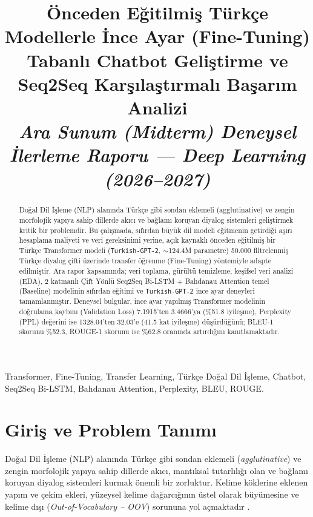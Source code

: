 \documentclass[conference]{IEEEtran}
\begin{document}
\title{Önceden Eğitilmiş Türkçe Modellerle İnce Ayar (Fine-Tuning) Tabanlı Chatbot Geliştirme ve Seq2Seq Karşılaştırmalı Başarım Analizi\\
{\large\textit{Ara Sunum (Midterm) Deneysel İlerleme Raporu --- Deep Learning (2026--2027)}}}

\author{
}

\maketitle

\begin{abstract}
Doğal Dil İşleme (NLP) alanında Türkçe gibi sondan eklemeli (agglutinative) ve zengin morfolojik yapıya sahip dillerde akıcı ve bağlamı koruyan diyalog sistemleri geliştirmek kritik bir problemdir. Bu çalışmada, sıfırdan büyük dil modeli eğitmenin getirdiği aşırı hesaplama maliyeti ve veri gereksinimi yerine, açık kaynaklı önceden eğitilmiş bir Türkçe Transformer modeli (\texttt{Turkish-GPT-2}, $\sim$124.4M parametre) 50.000 filtrelenmiş Türkçe diyalog çifti üzerinde transfer öğrenme (Fine-Tuning) yöntemiyle adapte edilmiştir. Ara rapor kapsamında; veri toplama, gürültü temizleme, keşifsel veri analizi (EDA), 2 katmanlı Çift Yönlü Seq2Seq Bi-LSTM + Bahdanau Attention temel (Baseline) modelinin sıfırdan eğitimi ve \texttt{Turkish-GPT-2} ince ayar deneyleri tamamlanmıştır. Deneysel bulgular, ince ayar yapılmış Transformer modelinin doğrulama kaybını (Validation Loss) 7.1915'ten 3.4666'ya (\%51.8 iyileşme), Perplexity (PPL) değerini ise 1328.04'ten 32.03'e (41.5 kat iyileşme) düşürdüğünü; BLEU-1 skorunu \%52.3, ROUGE-1 skorunu ise \%62.8 oranında artırdığını kanıtlamaktadır.
\end{abstract}

\begin{IEEEkeywords}
Transformer, Fine-Tuning, Transfer Learning, Türkçe Doğal Dil İşleme, Chatbot, Seq2Seq Bi-LSTM, Bahdanau Attention, Perplexity, BLEU, ROUGE.
\end{IEEEkeywords}

\section{Giriş ve Problem Tanımı}
Doğal Dil İşleme (NLP) alanında Türkçe gibi sondan eklemeli (\textit{agglutinative}) ve zengin morfolojik yapıya sahip dillerde akıcı, mantıksal tutarlılığı olan ve bağlamı koruyan diyalog sistemleri kurmak önemli bir zorluktur. Kelime köklerine eklenen yapım ve çekim ekleri, yüzeysel kelime dağarcığının üstel olarak büyümesine ve kelime dışı (\textit{Out-of-Vocabulary -- OOV}) sorununa yol açmaktadır \cite{sennrich2016}.
\end{document}
